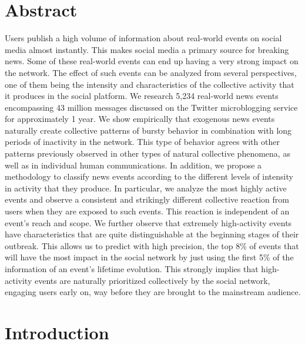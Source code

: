 \section*{Abstract}

Users publish a high volume of information about real-world events on social
media almost instantly.
%
This makes social media a primary source for breaking news.
%
Some of these real-world events can end up having a very strong impact on the
network.  
%
The effect of such events can be analyzed from several perspectives, one of them
being the intensity and characteristics of the collective activity that it
produces in the social platform. 
%
We research 5,234 real-world news events encompassing 43 million messages
discussed on the Twitter microblogging service for approximately 1 year.  
%
We show empirically that exogenous news events naturally create collective
patterns of bursty behavior in combination with long periods of inactivity in
the network. 
%
This type of behavior agrees with other patterns previously observed in other
types of natural collective phenomena, as well as in individual human
communications. 
%
In addition, we propose a methodology to classify news events according to the
different levels of intensity in activity that they produce. 
%
In particular, we analyze the most highly active events and observe a consistent
and strikingly different collective reaction from users when they are exposed to
such events. 
%
This reaction is independent of an event's reach and scope.  
%
We further observe that extremely high-activity events have characteristics that
are quite distinguishable at the beginning stages of their outbreak.  
%
This allows us to predict with high precision, the top 8\% of events that will
have the most impact in the social network by just using the first 5\% of the
information of an event's lifetime evolution. 
%
This strongly implies that high-activity events are naturally prioritized
collectively by the social network, engaging users early on, way before they are
brought to the mainstream audience.


\section{Introduction}

